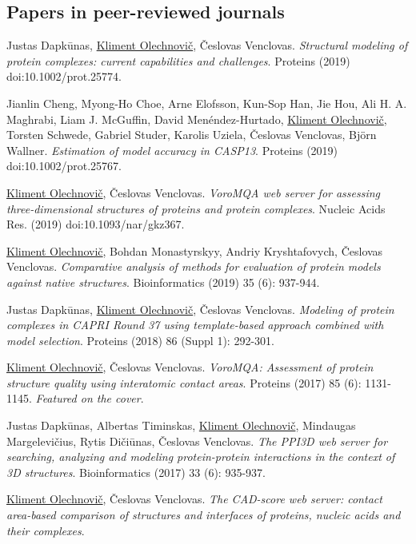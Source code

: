 \documentclass{article}
\newenvironment{enumerate_tight}{
\begin{enumerate}
  \setlength{\itemsep}{3pt}
  \setlength{\parskip}{0pt}
  \setlength{\parsep}{0pt}
}{\end{enumerate}}
\begin{document}
\subsection*{Papers in peer-reviewed journals}
\begin{enumerate_tight}
  \item Justas Dapkūnas, \underline{Kliment Olechnovič}, Česlovas Venclovas.
        \emph{Structural modeling of protein complexes: current capabilities and challenges}.
        Proteins (2019) doi:10.1002/prot.25774.
  \item Jianlin Cheng, Myong-Ho Choe, Arne Elofsson, Kun-Sop Han, Jie Hou, Ali H. A. Maghrabi, Liam J. McGuffin, David Menéndez-Hurtado, \underline{Kliment Olechnovič}, Torsten Schwede, Gabriel Studer, Karolis Uziela, Česlovas Venclovas, Björn Wallner.
        \emph{Estimation of model accuracy in CASP13}.
        Proteins (2019) doi:10.1002/prot.25767.
  \item \underline{Kliment Olechnovič}, Česlovas Venclovas.
        \emph{VoroMQA web server for assessing three-dimensional structures of proteins and protein complexes}.
        Nucleic Acids Res. (2019) doi:10.1093/nar/gkz367.
  \item \underline{Kliment Olechnovič}, Bohdan Monastyrskyy, Andriy Kryshtafovych, Česlovas Venclovas.
        \emph{Comparative analysis of methods for evaluation of protein models against native structures}.
        Bioinformatics (2019) 35 (6): 937-944.
  \item Justas Dapkūnas, \underline{Kliment Olechnovič}, Česlovas Venclovas.
        \emph{Modeling of protein complexes in CAPRI Round 37 using template-based approach combined with model selection}.
        Proteins (2018) 86 (Suppl 1): 292-301.
  \item \underline{Kliment Olechnovič}, Česlovas Venclovas.
        \emph{VoroMQA: Assessment of protein structure quality using interatomic contact areas}.
        Proteins (2017) 85 (6): 1131-1145. \emph{Featured on the cover}.
  \item Justas Dapkūnas, Albertas Timinskas, \underline{Kliment Olechnovič}, Mindaugas Margelevičius, Rytis Dičiūnas, Česlovas Venclovas.
        \emph{The PPI3D web server for searching, analyzing and modeling protein-protein interactions in the context of 3D structures}.
        Bioinformatics (2017) 33 (6): 935-937.
  \item \underline{Kliment Olechnovič}, Česlovas Venclovas.
        \emph{The CAD-score web server: contact area-based comparison of structures and interfaces of proteins, nucleic acids and their complexes}.

\end{enumerate_tight}
\end{document}
